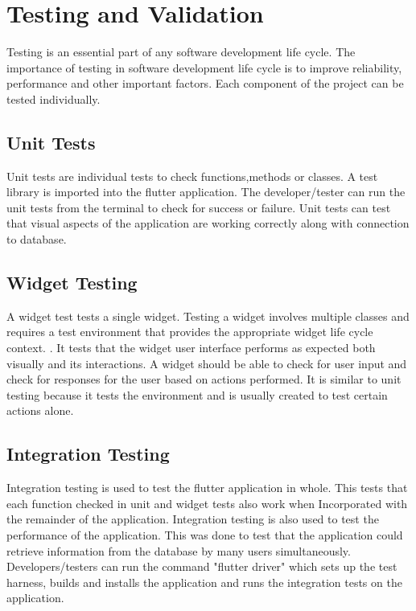 \section{Testing and Validation}
Testing is an essential part of any software development life cycle. The importance of testing in software development life cycle is to improve reliability, performance and other important factors.\cite{TestingLifeCycle} Each component of the project can be tested individually.
 
\subsection{Unit Tests}

Unit tests are individual tests to check functions,methods or classes. A test library is imported into the flutter application. The developer/tester can run the unit tests from the terminal to check for success or failure. Unit tests can test that visual aspects of the application are working correctly along with connection to database.

\subsection{Widget Testing}

A widget test tests a single widget. Testing a widget involves multiple classes and requires a test environment that provides the appropriate widget life cycle context. \cite{testing}. It tests that the widget user interface performs as expected both visually and its interactions. A widget should be able to check for user input and check for responses for the user based on actions performed. It is similar to unit testing because it tests the environment and is usually created to test certain actions alone.

\subsection{Integration Testing}

Integration testing is used to test the flutter application in whole. This tests that each function checked in unit and widget tests also work when Incorporated with the remainder of the application. Integration testing is also used to test the performance of the application. This was done to test that the application could retrieve information from the database by many users simultaneously. Developers/testers can run the command "flutter driver" which sets up the test harness, builds and installs the application and runs the integration tests on the application. \cite{IntegrationTest}

